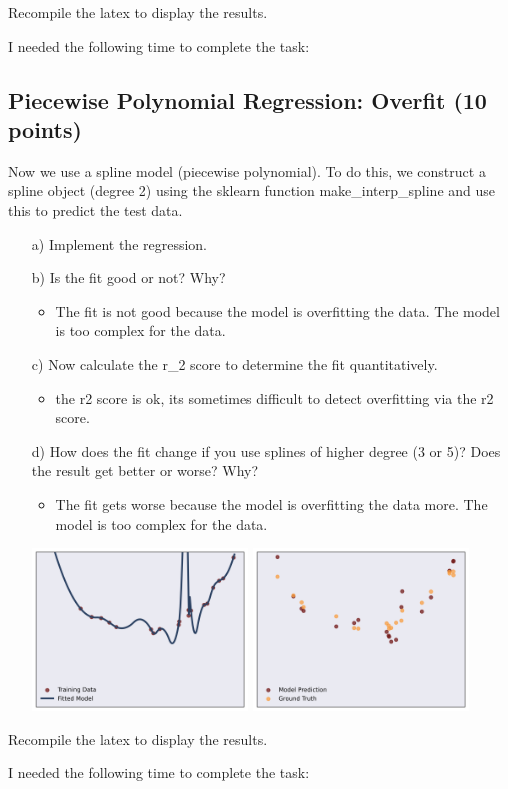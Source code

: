 \documentclass{article}
\begin{document}
Recompile the latex to display the results.

I needed the following time to complete the task:

\subsection{Piecewise Polynomial Regression: Overfit (10 points)}

Now we use a spline model (piecewise polynomial). To do this, we construct a spline object (degree 2) using the sklearn function make\_interp\_spline and use this to predict the test data.

\begin{enumerate}

\item[a)] Implement the regression.

\item[b)] Is the fit good or not? Why?
\begin{itemize}
	\item The fit is not good because the model is overfitting the data. The model is too complex for the data.
\end{itemize} 

\item[c)] Now calculate the r\_2 score to determine the fit quantitatively.
\begin{itemize}
	\item the r2 score is ok, its sometimes difficult to detect overfitting via the r2 score.
\end{itemize}

\item[d)] How does the fit change if you use splines of higher degree (3 or 5)? Does the result get better or worse? Why?
\begin{itemize}
	\item The fit gets worse because the model is overfitting the data more. The model is too complex for the data.
\end{itemize}

\includegraphics[width=0.45\textwidth]{source_code/overfit_spline_model.png}
\includegraphics[width=0.45\textwidth]{source_code/overfit_spline_testdata.png}

\end{enumerate}

Recompile the latex to display the results.

I needed the following time to complete the task:
\end{document}
